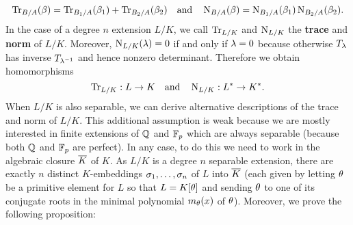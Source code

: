     \begin{equation}\label{equ:trace_and_norm_direct_sums}
      \operatorname{\mathrm{Tr}}_{B/A}(\beta) = \operatorname{\mathrm{Tr}}_{B_{1}/A}(\beta_{1})+\operatorname{\mathrm{Tr}}_{B_{2}/A}(\beta_{2}) \quad \text{and} \quad \operatorname{\mathrm{N}}_{B/A}(\beta) = \operatorname{\mathrm{N}}_{B_{1}/A}(\beta_{1})\operatorname{\mathrm{N}}_{B_{2}/A}(\beta_{2}).
    \end{equation}
    In the case of a degree $n$ extension $L/K$, we call $\operatorname{\mathrm{Tr}}_{L/K}$ and $\operatorname{\mathrm{N}}_{L/K}$ the \textbf{trace} and \textbf{norm} of $L/K$. Moreover, $\operatorname{\mathrm{N}}_{L/K}(\lambda) = 0$ if and only if $\lambda = 0$ because otherwise $T_{\lambda}$ has inverse $T_{\lambda^{-1}}$ and hence nonzero determinant. Therefore we obtain homomorphisms
    \[
      \operatorname{\mathrm{Tr}}_{L/K}:L \to K \quad \text{and} \quad \operatorname{\mathrm{N}}_{L/K}:L^{\ast} \to K^{\ast}.
    \]
    When $L/K$ is also separable, we can derive alternative descriptions of the trace and norm of $L/K$. This additional assumption is weak because we are mostly interested in finite extensions of $\mathbb{Q}$ and $\mathbb{F}_{p}$ which are always separable (because both $\mathbb{Q}$ and $\mathbb{F}_{p}$ are perfect). In any case, to do this we need to work in the algebraic closure $\overline{K}$ of $K$. As $L/K$ is a degree $n$ separable extension, there are exactly $n$ distinct $K$-embeddings $\sigma_{1},\ldots,\sigma_{n}$ of $L$ into $\overline{K}$ (each given by letting $\theta$ be a primitive element for $L$ so that $L = K[\theta]$ and sending $\theta$ to one of its conjugate roots in the minimal polynomial $m_{\theta}(x)$ of $\theta$). Moreover, we prove the following proposition:

